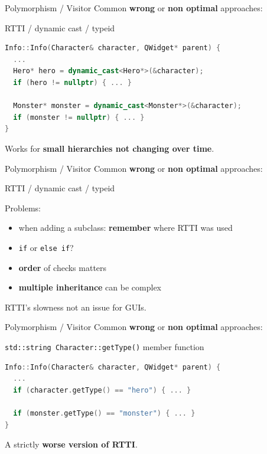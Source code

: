 \documentclass[11pt]{beamer}
\renewcommand{\emph}[1]{\textbf{#1}}
\begin{document}
\begin{frame}[fragile]{Polymorphism / Visitor}
 Common \emph{wrong} or \emph{non optimal} approaches:
 
 \begin{center}
  RTTI / dynamic cast / typeid
 \end{center}
 
 \begin{lstlisting}[language=C++]
Info::Info(Character& character, QWidget* parent) {
  ...
  Hero* hero = dynamic_cast<Hero*>(&character);
  if (hero != nullptr) { ... }
  
  Monster* monster = dynamic_cast<Monster*>(&character);
  if (monster != nullptr) { ... }
}
\end{lstlisting}
 
 Works for \emph{small hierarchies not changing over time}.
\end{frame}

\begin{frame}{Polymorphism / Visitor}
 Common \emph{wrong} or \emph{non optimal} approaches:
 
 \begin{center}
  RTTI / dynamic cast / typeid
 \end{center}
 
 Problems:
 \begin{itemize}
  \item when adding a subclass: \emph{remember} where RTTI was used
  \item \texttt{if} or \texttt{else if}?
  \item \emph{order} of checks matters
  \item \emph{multiple inheritance} can be complex
 \end{itemize}
 
 RTTI's slowness not an issue for GUIs.
\end{frame}

\begin{frame}[fragile]{Polymorphism / Visitor}
 Common \emph{wrong} or \emph{non optimal} approaches:
 
 \begin{center}
  \texttt{std::string Character::getType()} member function
 \end{center}
 
 \begin{lstlisting}[language=C++]
Info::Info(Character& character, QWidget* parent) {
  ...
  if (character.getType() == "hero") { ... }
  
  if (monster.getType() == "monster") { ... }
}
\end{lstlisting}
 
 A strictly \emph{worse version of RTTI}.
\end{frame}
\end{document}

